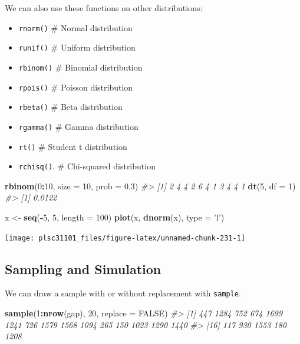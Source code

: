 \documentclass[
]{book}
\newenvironment{Shaded}{\begin{snugshade}}{\end{snugshade}}
\newcommand{\CommentTok}[1]{\textcolor[rgb]{0.56,0.35,0.01}{\textit{#1}}}
\newcommand{\DataTypeTok}[1]{\textcolor[rgb]{0.13,0.29,0.53}{#1}}
\newcommand{\DecValTok}[1]{\textcolor[rgb]{0.00,0.00,0.81}{#1}}
\newcommand{\FloatTok}[1]{\textcolor[rgb]{0.00,0.00,0.81}{#1}}
\newcommand{\KeywordTok}[1]{\textcolor[rgb]{0.13,0.29,0.53}{\textbf{#1}}}
\newcommand{\NormalTok}[1]{#1}
\newcommand{\OperatorTok}[1]{\textcolor[rgb]{0.81,0.36,0.00}{\textbf{#1}}}
\newcommand{\OtherTok}[1]{\textcolor[rgb]{0.56,0.35,0.01}{#1}}
\newcommand{\StringTok}[1]{\textcolor[rgb]{0.31,0.60,0.02}{#1}}
\providecommand{\tightlist}{%
  \setlength{\itemsep}{0pt}\setlength{\parskip}{0pt}}
\begin{document}
We can also use these functions on other distributions:

\begin{itemize}
\tightlist
\item
  \texttt{rnorm()} \# Normal distribution
\item
  \texttt{runif()} \# Uniform distribution
\item
  \texttt{rbinom()} \# Binomial distribution
\item
  \texttt{rpois()} \# Poisson distribution
\item
  \texttt{rbeta()} \# Beta distribution
\item
  \texttt{rgamma()} \# Gamma distribution
\item
  \texttt{rt()} \# Student t distribution
\item
  \texttt{rchisq()}. \# Chi-squared distribution
\end{itemize}

\begin{Shaded}
\begin{Highlighting}[]
\KeywordTok{rbinom}\NormalTok{(}\DecValTok{0}\OperatorTok{:}\DecValTok{10}\NormalTok{, }\DataTypeTok{size =} \DecValTok{10}\NormalTok{, }\DataTypeTok{prob =} \FloatTok{0.3}\NormalTok{)}
\CommentTok{#>  [1] 2 4 4 2 6 4 1 3 4 4 1}
\KeywordTok{dt}\NormalTok{(}\DecValTok{5}\NormalTok{, }\DataTypeTok{df =} \DecValTok{1}\NormalTok{)}
\CommentTok{#> [1] 0.0122}

\NormalTok{x <-}\StringTok{ }\KeywordTok{seq}\NormalTok{(}\OperatorTok{-}\DecValTok{5}\NormalTok{, }\DecValTok{5}\NormalTok{, }\DataTypeTok{length =} \DecValTok{100}\NormalTok{)}
\KeywordTok{plot}\NormalTok{(x, }\KeywordTok{dnorm}\NormalTok{(x), }\DataTypeTok{type =} \StringTok{'l'}\NormalTok{)}
\end{Highlighting}
\end{Shaded}

\begin{center}\texttt{[image: plsc31101\_files/figure-latex/unnamed-chunk-231-1]} \end{center}

\hypertarget{sampling-and-simulation}{%
\subsection{Sampling and Simulation}\label{sampling-and-simulation}}

We can draw a sample with or without replacement with \texttt{sample}.

\begin{Shaded}
\begin{Highlighting}[]
\KeywordTok{sample}\NormalTok{(}\DecValTok{1}\OperatorTok{:}\KeywordTok{nrow}\NormalTok{(gap), }\DecValTok{20}\NormalTok{, }\DataTypeTok{replace =} \OtherTok{FALSE}\NormalTok{)}
\CommentTok{#>  [1]  447 1284  752  674 1699 1241  726 1579 1568 1094  265  150 1023 1290 1440}
\CommentTok{#> [16]  117  930 1553  180 1208}
\end{Highlighting}
\end{Shaded}
\end{document}
